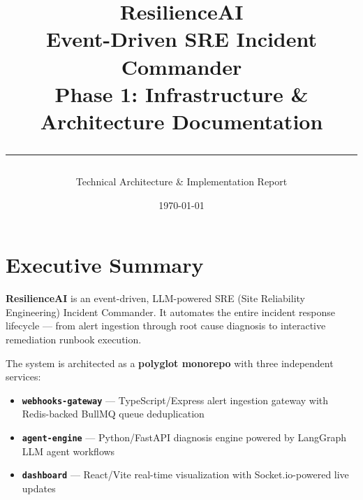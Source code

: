 \documentclass[11pt,a4paper]{article}
\title{
  \vspace{1cm}
  {\Huge \textbf{ResilienceAI}}\\[0.3cm]
  {\Large Event-Driven SRE Incident Commander}\\[0.5cm]
  {\large \textcolor{primary}{\textbf{Phase 1: Infrastructure \& Architecture Documentation}}}\\[0.3cm]
  \rule{0.6\textwidth}{1pt}
}
\author{Technical Architecture \& Implementation Report}
\date{\today}
\begin{document}
\maketitle
\thispagestyle{empty}

\vspace{1cm}
\begin{center}
\end{center}

\newpage
\tableofcontents
\newpage

\section{Executive Summary}

\textbf{ResilienceAI} is an event-driven, LLM-powered SRE (Site Reliability Engineering) Incident Commander. It automates the entire incident response lifecycle — from alert ingestion through root cause diagnosis to interactive remediation runbook execution.

The system is architected as a \textbf{polyglot monorepo} with three independent services:

\begin{itemize}[leftmargin=*,itemsep=4pt]
  \item \textbf{\texttt{webhooks-gateway}} — TypeScript/Express alert ingestion gateway with Redis-backed BullMQ queue deduplication
  \item \textbf{\texttt{agent-engine}} — Python/FastAPI diagnosis engine powered by LangGraph LLM agent workflows
  \item \textbf{\texttt{dashboard}} — React/Vite real-time visualization with Socket.io-powered live updates
\end{itemize}
\end{document}
